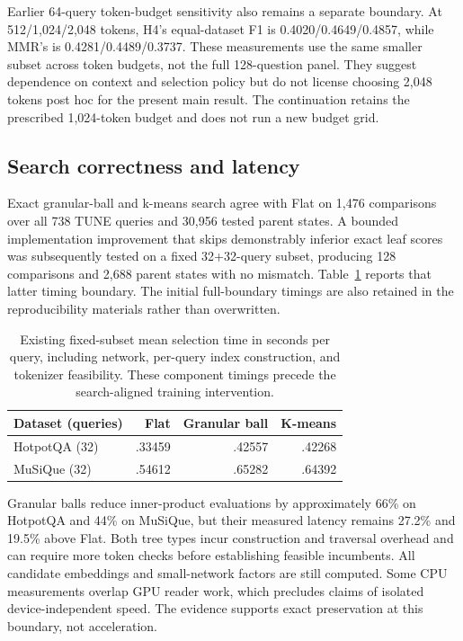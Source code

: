 \documentclass[pdflatex,sn-mathphys-num]{sn-jnl}
\begin{document}
Earlier 64-query token-budget sensitivity also remains a separate boundary.
At 512/1,024/2,048 tokens, H4's equal-dataset F1 is
0.4020/0.4649/0.4857, while MMR's is 0.4281/0.4489/0.3737.
These measurements use the same smaller subset across token budgets, not
the full 128-question panel. They suggest dependence on context and
selection policy but do not license choosing 2,048 tokens post hoc for the
present main result. The continuation retains the prescribed 1,024-token
budget and does not run a new budget grid.

\subsection{Search correctness and latency}\label{sec:cost}
Exact granular-ball and k-means search agree with Flat on 1,476 comparisons
over all 738 TUNE queries and 30,956 tested parent states. A bounded
implementation improvement that skips demonstrably inferior exact leaf
scores was subsequently tested on a fixed 32+32-query subset, producing
128 comparisons and 2,688 parent states with no mismatch. Table~\ref{tab:cost}
reports that latter timing boundary. The initial full-boundary timings are
also retained in the reproducibility materials rather than overwritten.

\begin{table}[t]\centering
\caption{Existing fixed-subset mean selection time in seconds per query,
including network, per-query index construction, and tokenizer feasibility.
These component timings precede the search-aligned training intervention.}
\label{tab:cost}
\begin{tabular}{lrrr}\toprule
Dataset (queries) & Flat & Granular ball & K-means\\\midrule
HotpotQA (32) & .33459 & .42557 & .42268\\
MuSiQue (32) & .54612 & .65282 & .64392\\\bottomrule
\end{tabular}
\end{table}

Granular balls reduce inner-product evaluations by approximately 66\% on
HotpotQA and 44\% on MuSiQue, but their measured latency remains 27.2\%
and 19.5\% above Flat. Both tree types incur construction and traversal
overhead and can require more token checks before establishing feasible
incumbents. All candidate embeddings and small-network factors are still
computed. Some CPU measurements overlap GPU reader work, which precludes
claims of isolated device-independent speed. The evidence supports exact
preservation at this boundary, not acceleration.
\end{document}
